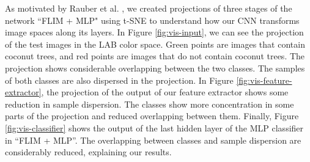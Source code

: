 \documentclass[journal, twoside]{IEEEtran}
\begin{document}
{As motivated by Rauber et al. \cite{rauber2016visualizing}, we created projections of three stages of the network ``FLIM + MLP" using t-SNE \cite{maaten2008visualizing} to understand how our CNN transforms image spaces along its layers. In Figure \ref{fig:vis-input}, we can see the projection of the test images in the LAB color space. Green points are images that contain coconut trees, and red points are images that do not contain coconut trees. The projection shows considerable overlapping between the two classes. The samples of both classes are also dispersed in the projection. In Figure \ref{fig:vis-feature-extractor}, the projection of the output of our feature extractor shows some reduction in sample dispersion. The classes show more concentration in some parts of the projection and reduced overlapping between them. Finally, Figure \ref{fig:vis-classifier} shows the output of the last hidden layer of the MLP classifier in ``FLIM + MLP''. The overlapping between classes and sample dispersion are considerably reduced, explaining our results.

\begin{figure}
\end{figure}}
\end{document}
